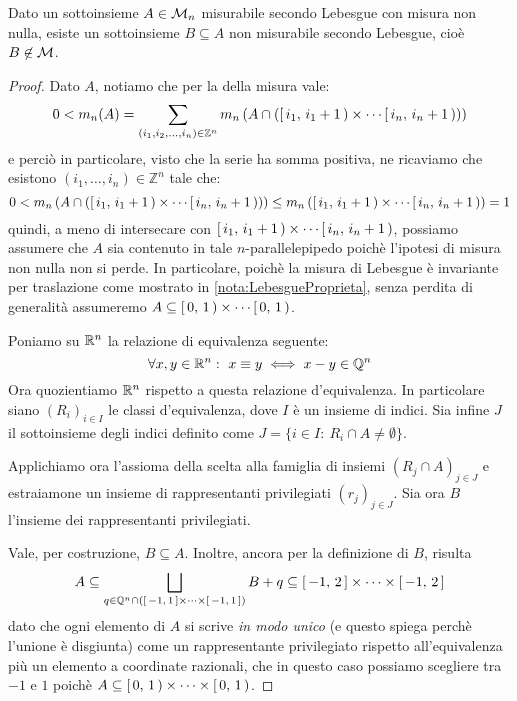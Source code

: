 \begin{theorem}\label{InsiemeVitali}
	Dato un sottoinsieme $A\in\mathcal M_n$ misurabile secondo Lebesgue con misura non nulla, esiste un sottoinsieme $B\subseteq A$ non misurabile secondo Lebesgue, cioè $B\not\in\mathcal M$.
\end{theorem}
\begin{proof}
	Dato $A$, notiamo che per la \sigadd[ità] della misura vale:
	\begin{equation*}
		0<m_n(A)=\sum_{(i_1,i_2,\dots,i_n)\in\mathbb Z^n} m_n\left(A\cap\left(\left[\,i_1,\,i_1+1\,\right)\times\cdots\left[\,i_n,\,i_n+1\,\right)\right)\right)
	\end{equation*}
	e perciò in particolare, visto che la serie ha somma positiva, ne ricaviamo che esistono $(i_1,\dots,i_n)\in \mathbb Z^n$ tale che:
	\begin{equation*}
		0<m_n\left(A\cap\left(\left[\,i_1,\,i_1+1\,\right)\times\cdots\left[\,i_n,\,i_n+1\,\right)\right)\right)\le
		m_n\left(\left[\,i_1,\,i_1+1\,\right)\times\cdots\left[\,i_n,\,i_n+1\,\right)\right)=1
	\end{equation*}
	quindi, a meno di intersecare con $\left[\,i_1,\,i_1+1\,\right)\times\cdots\left[\,i_n,\,i_n+1\,\right)$, possiamo assumere che $A$ sia contenuto in tale $n$-parallelepipedo poichè l'ipotesi di misura non nulla non si perde. 
	In particolare, poichè la misura di Lebesgue è invariante per traslazione come mostrato in \cref{nota:LebesgueProprieta}, senza perdita di generalità assumeremo $A\subseteq \left[\,0,\,1\,\right)\times\cdots\left[\,0,\,1\,\right)$.
	
	Poniamo su $\mathbb R^n$ la relazione di equivalenza seguente:
	\begin{equation*}
		\forall x,y\in\R^n:\ x\equiv y\iff x-y\in\mathbb Q^n
	\end{equation*}
	Ora quozientiamo $\mathbb R^n$ rispetto a questa relazione d'equivalenza. In particolare siano $(R_i)_{i\in I}$ le classi d'equivalenza, dove $I$ è un insieme di indici. Sia infine $J$ il sottoinsieme degli indici definito come $J=\{i\in I:\ R_i\cap A\not =\emptyset\}$. 

	Applichiamo ora l'assioma della scelta alla famiglia di insiemi $(R_j\cap A)_{j\in J}$ e estraiamone un insieme di rappresentanti privilegiati $(r_j)_{j\in J}$. Sia ora $B$ l'insieme dei rappresentanti privilegiati.
	
	Vale, per costruzione, $B\subseteq A$. 
	Inoltre, ancora per la definizione di $B$, risulta
	\begin{equation}\label{ContenimentiVitali}
		A\subseteq\bigsqcup_{q\in\mathbb Q^n\cap\left(\left[\,-1,\,1\,\right]\times\cdots \times\left[\,-1,\,1\,\right]\right)} B+q\subseteq \left[\,-1,\,2\,\right]\times\cdots\times\left[\,-1,\,2\,\right]
	\end{equation}
	dato che ogni elemento di $A$ si scrive \emph{in modo unico} (e questo spiega perchè l'unione è disgiunta) come un rappresentante privilegiato rispetto all'equivalenza più un elemento a coordinate razionali, che in questo caso possiamo scegliere tra $-1$ e $1$ poichè $A\subseteq \left[\,0,\,1\,\right)\times\cdots \times\left[\,0,\,1\,\right)$.
	

\end{proof}
